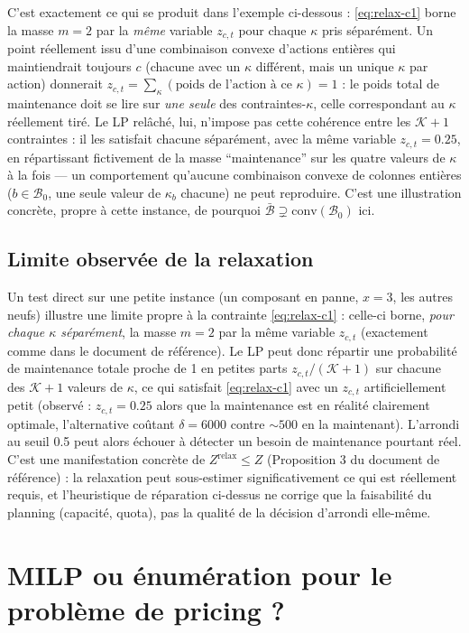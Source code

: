 \documentclass[11pt]{article}
\begin{document}
C'est exactement ce qui se produit dans l'exemple ci-dessous : \eqref{eq:relax-c1} borne la masse $m=2$
par la \emph{même} variable $z_{c,t}$ pour chaque $\kappa$ pris séparément. Un point réellement issu d'une
combinaison convexe d'actions entières qui maintiendrait toujours $c$ (chacune avec un $\kappa$ différent,
mais un unique $\kappa$ par action) donnerait $z_{c,t}=\sum_\kappa(\text{poids de l'action à ce }\kappa)=1$
: le poids total de maintenance doit se lire sur \emph{une seule} des contraintes-$\kappa$, celle
correspondant au $\kappa$ réellement tiré. Le LP relâché, lui, n'impose pas cette cohérence entre les
$\mathcal{K}+1$ contraintes : il les satisfait chacune séparément, avec la même variable $z_{c,t}=0.25$,
en répartissant fictivement de la masse ``maintenance'' sur les quatre valeurs de $\kappa$ à la fois ---
un comportement qu'aucune combinaison convexe de colonnes entières ($b\in\mathcal{B}_0$, une seule valeur
de $\kappa_b$ chacune) ne peut reproduire. C'est une illustration concrète, propre à cette instance, de
pourquoi $\bar{\mathcal{B}}\supsetneq\mathrm{conv}(\mathcal{B}_0)$ ici.

\subsection{Limite observée de la relaxation}

Un test direct sur une petite instance (un composant en panne, $x=3$, les autres neufs) illustre une
limite propre à la contrainte \eqref{eq:relax-c1} : celle-ci borne, \emph{pour chaque $\kappa$
séparément}, la masse $m=2$ par la même variable $z_{c,t}$ (exactement comme dans le document de
référence). Le LP peut donc répartir une probabilité de maintenance totale proche de 1 en petites parts
$z_{c,t}/(\mathcal{K}+1)$ sur chacune des $\mathcal{K}+1$ valeurs de $\kappa$, ce qui satisfait
\eqref{eq:relax-c1} avec un $z_{c,t}$ artificiellement petit (observé : $z_{c,t}=0.25$ alors que la
maintenance est en réalité clairement optimale, l'alternative coûtant $\delta=6000$ contre $\sim\!500$ en
la maintenant). L'arrondi au seuil 0.5 peut alors échouer à détecter un besoin de maintenance pourtant
réel. C'est une manifestation concrète de $Z^{\text{relax}}\le Z$ (Proposition 3 du document de
référence) : la relaxation peut sous-estimer significativement ce qui est réellement requis, et
l'heuristique de réparation ci-dessus ne corrige que la faisabilité du planning (capacité, quota), pas la
qualité de la décision d'arrondi elle-même.

\section{MILP ou énumération pour le problème de pricing ?}
\end{document}
